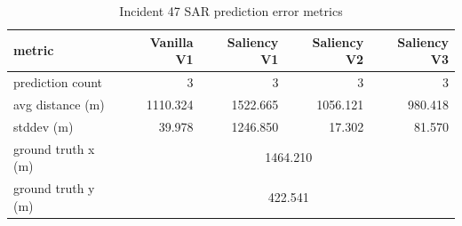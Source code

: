 \begin{table}[ht]
\centering
\caption{Incident 47 SAR prediction error metrics}
\label{tab:sar-incident-47}
\begin{tabular}{lrrrr}
\hline
metric & Vanilla V1 & Saliency V1 & Saliency V2 & Saliency V3 \\
\hline
prediction count & 3 & 3 & 3 & 3 \\
avg distance (m) & 1110.324 & 1522.665 & 1056.121 & 980.418 \\
stddev (m) & 39.978 & 1246.850 & 17.302 & 81.570 \\
ground truth x (m) & \multicolumn{4}{c}{1464.210} \\
ground truth y (m) & \multicolumn{4}{c}{422.541} \\
\hline
\end{tabular}
\end{table}
